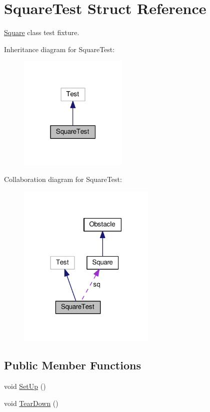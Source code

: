 \hypertarget{structSquareTest}{}\section{Square\+Test Struct Reference}
\label{structSquareTest}


\hyperlink{classSquare}{Square} class test fixture.  




Inheritance diagram for Square\+Test\+:\nopagebreak
\begin{figure}[H]
\begin{center}
\leavevmode
\includegraphics[width=147pt]{structSquareTest__inherit__graph}
\end{center}
\end{figure}


Collaboration diagram for Square\+Test\+:\nopagebreak
\begin{figure}[H]
\begin{center}
\leavevmode
\includegraphics[width=186pt]{structSquareTest__coll__graph}
\end{center}
\end{figure}
\subsection*{Public Member Functions}
\begin{DoxyCompactItemize}
\item 
void \hyperlink{structSquareTest_ac719b65aeeaff1b1af8df1edff6f65d2}{Set\+Up} ()
\item 
void \hyperlink{structSquareTest_a30608c5d65d639a9957447218dcc997c}{Tear\+Down} ()
\end{DoxyCompactItemize}
